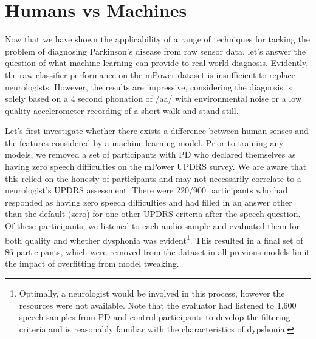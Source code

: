 \documentclass[12pt, twoside]{book}
\begin{document}






\section{Humans vs Machines}
\label{powerml}
Now that we have shown the applicability of a range of techniques for tacking the problem of diagnosing Parkinson's disease from raw sensor data, let's answer the question of what machine learning can provide to real world diagnosis. Evidently, the raw classifier performance on the mPower dataset is insufficient to replace neurologists. However, the results are impressive, considering the diagnosis is solely based on a 4 second phonation of /aa/ with environmental noise or a low quality accelerometer recording of a short walk and stand still.

Let's first investigate whether there exists a difference between human senses and the features considered by a machine learning model. Prior to training any models, we removed a set of participants with PD who declared themselves as having zero speech difficulties on the mPower UPDRS survey. We are aware that this relied on the honesty of participants and may not necessarily correlate to a neurologist's UPDRS assessment. There were 220/900 participants who had responded as having zero speech difficulties and had filled in an answer other than the default (zero) for one other UPDRS criteria after the speech question. Of these participants, we listened to each audio sample and evaluated them for both quality and whether dysphonia was evident\footnote{Optimally, a neurologist would be involved in this process, however the resources were not available. Note that the evaluator had listened to 1,600 speech samples from PD and control participants to develop the filtering criteria and is reasonably familiar with the characteristics of dypshonia.}. This resulted in a final set of 86 participants, which were removed from the dataset in all previous models limit the impact of overfitting from model tweaking.
\end{document}
